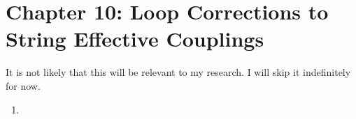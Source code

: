 \documentclass[11pt, class=article, crop=false]{standalone}
\begin{document}
\section*{Chapter 10: Loop Corrections to String Effective Couplings} %
\label{sec:chapter_10_loop_corrections_to_string_effective_couplings}	
\begin{center}
	It is not likely that this will be relevant to my research. I will skip it indefinitely for now.
\end{center}
\begin{enumerate}
	
	\item 
\end{enumerate}

\end{document}
